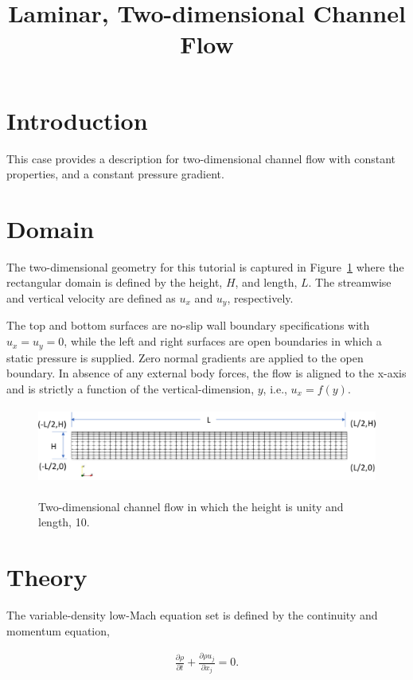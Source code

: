 \documentclass{article}
\title{Laminar, Two-dimensional Channel Flow}
\date{}
\begin{document}
\maketitle

\section{Introduction}
This case provides a description for two-dimensional channel flow
with constant properties, and a constant pressure gradient.

\section{Domain}
The two-dimensional geometry for this tutorial is captured in 
Figure~\ref{fig:geom} where the rectangular domain is defined by the 
height, $H$, and length, $L$. The streamwise and vertical velocity are 
defined as $u_x$ and $u_y$, respectively.

The top and bottom surfaces are no-slip wall boundary specifications with $u_x = u_y = 0$,
while the left and right surfaces are open boundaries in which a static 
pressure is supplied. Zero normal gradients are applied to the open boundary. In 
absence of any external body forces, the flow is 
aligned to the x-axis and is strictly a function of the vertical-dimension, $y$,
i.e., $u_x = f(y)$.

\begin{figure}[!htbp]
  \centering
  {
   \includegraphics[height=1.0in]{images/2d_quad4_channel_geom.pdf}
  }
  \caption{Two-dimensional channel flow in which the height is unity and length, 10.}
  \label{fig:geom}
\end{figure}

\section{Theory}
The variable-density low-Mach equation set is defined by the continuity and momentum equation,

\begin{align}
  \frac {\partial \rho }{\partial t} + \frac{ \partial \rho u_j}{\partial x_j} = 0.
\label{eq:contEq}
\end{align} 
\end{document}
